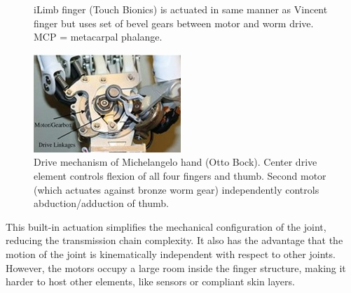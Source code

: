 \documentclass[a4paper, 10pt, conference]{ieeeconf}      %
\begin{document}
\begin{itemize}
\begin{figure}[h!]
  \caption{iLimb finger (Touch Bionics) is actuated in same manner as Vincent finger but uses set of bevel gears between motor and worm drive. MCP = metacarpal phalange.}
  \label{fig:iLimbFinger}
	\end{figure}	
	\begin{figure}[h!]
\centering  \includegraphics[scale=0.7]{./images/MichelangeloDriveMechanism}
  \caption{Drive mechanism of Michelangelo hand (Otto Bock). Center drive element controls flexion of all four fingers and thumb. Second motor (which actuates against bronze worm gear) independently controls abduction/adduction of thumb.}
  \label{fig:MichelangeloDriveMechanism}
	\end{figure}
\end{itemize}
This built-in actuation simplifies the mechanical configuration of the joint, reducing the transmission chain complexity. It also has the advantage that the motion of the joint is kinematically independent with respect to other joints. However, the motors occupy a large room inside the finger structure, making it harder to host other elements, like sensors or compliant skin layers.\\
\end{document}
